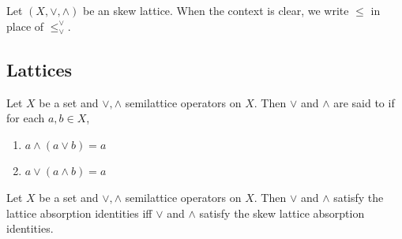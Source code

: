 \documentclass{book}
\begin{document}
	\begin{note}
		Let $(X, \vee, \wedge)$ be an skew lattice. When the context is clear, we write $\leq$ in place of $\leq_{\vee}^{\vee}$. 
	\end{note}
	
	
	
	
	
	
	
	
	
	
	
	
	
	
	
	
	
	
	
	
	
	
	
	
	
	
	
	
	
	
	
	
	
	
	
	
	
	
	
	
	
	
	
	
	
	
	
	
	
	
	
	
	\subsection{Lattices}
	
	\begin{defn} 
		Let $X$ be a set and $\vee, \wedge$ semilattice operators on $X$. Then $\vee$ and $\wedge$ are said to  if for each $a,b \in X$,
		\begin{enumerate}
			\item $a \wedge (a \vee b) = a$
			\item $a \vee (a \wedge b) = a$
		\end{enumerate} 
	\end{defn}
	
	\begin{ex} 
		Let $X$ be a set and $\vee, \wedge$ semilattice operators on $X$. Then $\vee$ and $\wedge$ satisfy the lattice absorption identities iff $\vee$ and $\wedge$ satisfy the skew lattice absorption identities.
	\end{ex}
	
\end{document}
